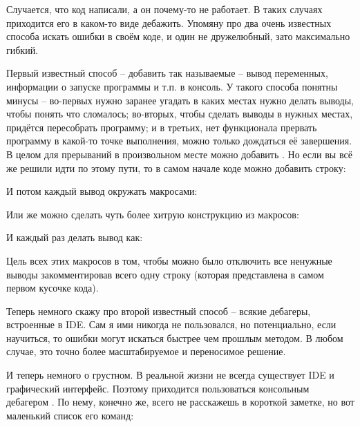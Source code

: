 Случается, что код написали, а он почему-то не работает. В таких случаях приходится его в каком-то виде дебажить. Упомяну про два очень известных способа искать ошибки в своём коде, и один не дружелюбный, зато максимально гибкий.

Первый известный способ -- добавить так называемые  -- вывод переменных, информации о запуске программы и т.п. в консоль. У такого способа понятны минусы -- во-первых нужно заранее угадать в каких местах нужно делать выводы, чтобы понять что сломалось; во-вторых, чтобы сделать выводы в нужных местах, придётся пересобрать программу; и в третьих, нет функционала прервать программу в какой-то точке выполнения, можно только дождаться её завершения. В целом для прерываний в произвольном месте можно добавить . Но если вы всё же решили идти по этому пути, то в самом начале коде можно добавить строку:


И потом каждый вывод окружать макросами:


Или же можно сделать чуть более хитрую конструкцию из макросов:


И каждый раз делать вывод как:


Цель всех этих макросов в том, чтобы можно было отключить все ненужные выводы закомментировав всего одну строку (которая представлена в самом первом кусочке кода).

Теперь немного скажу про второй известный способ -- всякие дебагеры, встроенные в IDE. Сам я ими никогда не пользовался, но потенциально, если научиться, то ошибки могут искаться быстрее чем прошлым методом. В любом случае, это точно более масштабируемое и переносимое решение.

И теперь немного о грустном. В реальной жизни не всегда существует IDE и графический интерфейс. Поэтому приходится пользоваться консольным дебагером . По нему, конечно же, всего не расскажешь в короткой заметке, но вот маленький список его команд:


